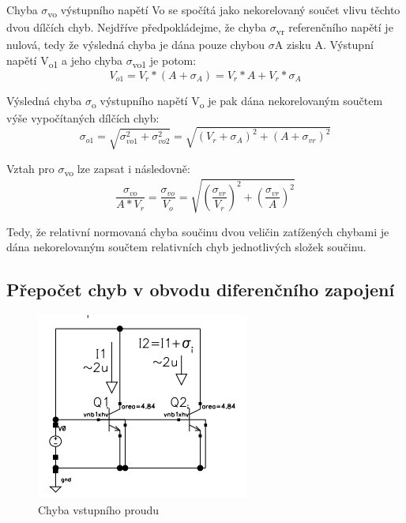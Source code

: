 Chyba $\sigma$\textsubscript{vo} výstupního napětí Vo se spočítá jako nekorelovaný součet vlivu těchto dvou dílčích chyb. Nejdříve předpokládejme, že chyba $\sigma$\textsubscript{vr} referenčního napětí je nulová, tedy že výsledná chyba je dána pouze chybou $\sigma$A zisku A. Výstupní napětí V\textsubscript{o1} a jeho chyba $\sigma$\textsubscript{vo1} je potom:
\begin{equation}
V_{o1} = V_{r}*(A+\sigma_{A})=V_{r}*A+V_{r}*\sigma_{A}
\end{equation}

Výsledná chyba $\sigma$\textsubscript{o} výstupního napětí V\textsubscript{o} je pak dána nekorelovaným součtem výše vypočítaných dílčích chyb:
\begin{equation}
\sigma_{o1} = \sqrt{\sigma_{vo1}^{2}+\sigma_{vo2}^{2}}=\sqrt{(V_{r}+\sigma_{A})^2+(A+\sigma_{vr})^2}
\end{equation}

Vztah pro $\sigma$\textsubscript{vo} lze zapsat i následovně:
\begin{equation}
\frac{\sigma_{vo}}{A*V_{r}}=\frac{\sigma_{vo}}{V_{o}}=\sqrt{(\frac{\sigma_{vr}}{V_{r}})^2+(\frac{\sigma_{vr}}{A})^2}
\end{equation}

Tedy, že relativní normovaná chyba součinu dvou veličin zatížených chybami je dána nekorelovaným součtem relativních chyb jednotlivých složek součinu.

\subsection{Přepočet chyb v obvodu diferenčního zapojení}

\begin{figure}[h]
   \begin{center}
     \includegraphics[scale=1]{images/Prepocet.png}
   \end{center}
   \caption{Chyba vstupního proudu}
\end{figure}

